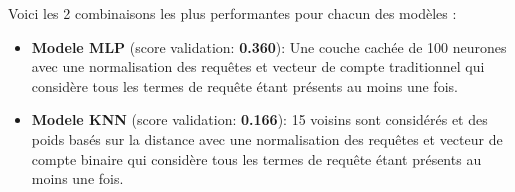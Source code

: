 Voici les 2 combinaisons les plus performantes pour chacun des modèles :

\begin{itemize}
  \item \textbf{Modele MLP} (score validation: \textbf{0.360}): Une couche cachée de 100 neurones avec une normalisation des requêtes et vecteur de compte traditionnel qui considère tous les termes de requête étant présents au moins une fois.
  \item \textbf{Modele KNN} (score validation: \textbf{0.166}): 15 voisins sont considérés et des poids basés sur la distance avec une normalisation des requêtes et vecteur de compte binaire qui considère tous les termes de requête étant présents au moins une fois.
\end{itemize}




